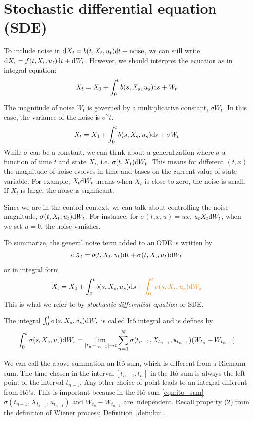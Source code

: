 \documentclass[11pt]{book}
\newcommand{\dt}{\text{\normalfont d}t}
\newcommand{\ds}{\text{\normalfont d}s}
\newcommand{\dX}{\text{\normalfont d}X}
\newcommand{\dW}{\text{\normalfont d}W}
\begin{document}
\section{Stochastic differential equation (SDE)}
\label{sec:sde}
To include noise in $\dX_t=b(t,X_t,u_t)\dt+\text{noise}$, we can still write  $\dX_t=f(t,X_t,u_t)\dt+\dW_t$. However, we should interpret the equation as in integral equation:
\[
X_t=X_0+\int_0^t b(s,X_s,u_s)\ds+W_t
\]

The magnitude of noise $W_t$ is governed by a multiplicative constant, $\sigma W_t$. In this case, the variance of the noise is $\sigma^2 t$.   
\[
X_t=X_0+\int_0^t b(s,X_s,u_s)\ds+\sigma W_t
\]
While $\sigma$ can be a constant, we can think about a generalization where $\sigma$ a function of time $t$ and state $X_t$, i.e. $\sigma(t,X_t) \dW_t$. This means for different $(t,x)$ the magnitude of noise evolves in time and bases on the current value of state variable. For example, $X_t\dW_t$ means when $X_t$ is close to zero, the noise is small. If $X_t$ is large, the noise is significant. 

Since we are in the control context, we can talk about controlling the noise magnitude, $\sigma(t,X_t,u_t) \dW_t$. For instance, for $\sigma(t,x,u)=ux$, $u_tX_t\dW_t$, when we set $u=0$, the noise vanishes. 

To summarize, the general noise term added to an ODE is written by 
\[
\dX_t= b(t,X_t,u_t)\dt+\sigma(t,X_t,u_t)\dW_t
\]
or in integral form
\[
X_t=X_0+\int_0^t b(s,X_s,u_s)\ds+{\color{orange}\int_0^t \sigma(s,X_s,u_s)\dW_s}
\]
This is what we refer to by \emph{stochastic differential equation} or SDE.

The integral $\int_0^t \sigma(s,X_s,u_s)\dW_s$ is called Itô integral and is defines by
\begin{equation}
\label{eqn:ito_sum}
\int_0^t \sigma(s,X_s,u_s)\dW_s = \lim_{|t_n-t_{n-1}|\to0}\sum_{n=1}^{N} \sigma(t_{n-1},X_{t_{n-1}},u_{t_{n-1}})(W_{t_{n}}-W_{t_{n-1}})    
\end{equation}

We can call the above summation an Itô sum, which is different from a Riemann sum. The time chosen in the interval $[t_{n-1},t_{n}]$ in the Itô sum is always the left point of the interval $t_{n-1}$. Any other choice of point leads to an integral different from Itô's.  This is important because in the Itô sum \eqref{eqn:ito_sum} $\sigma(t_{n-1},X_{t_{n-1}},u_{t_{n-1}})$ and $W_{t_{n}}-W_{t_{n-1}}$ are independent. Recall property (2) from the definition of Wiener process; Definition~\ref{defn:bm}.
\end{document}
